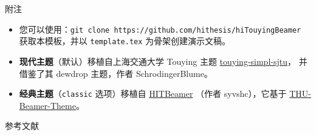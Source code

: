 \documentclass[aspectratio=169]{ctexbeamer} %
\begin{document}
\begin{frame}{附注}
  \begin{itemize}
    \item 您可以使用：\texttt{git clone
      https://github.com/hithesis/hiTouyingBeamer}
      获取本模板，并以 \texttt{template.tex} 为骨架创建演示文稿。
    \item \textbf{现代主题}（默认）移植自上海交通大学 Touying 主题
      \href{https://github.com/sjtug/touying-sjtu}{touying-simpl-sjtu}，
      并借鉴了其 dewdrop 主题，作者 SchrodingerBlume。
    \item \textbf{经典主题}（\texttt{classic} 选项）移植自
      \href{https://github.com/hithesis/HITBeamer}{HITBeamer}
      （作者 syvshc），它基于
      \href{https://github.com/Trinkle23897/THU-Beamer-Theme}{THU-Beamer-Theme}。
  \end{itemize}
\end{frame}

\begin{frame}{参考文献}
  \printbibliography[heading=none]
\end{frame}


\end{document}
